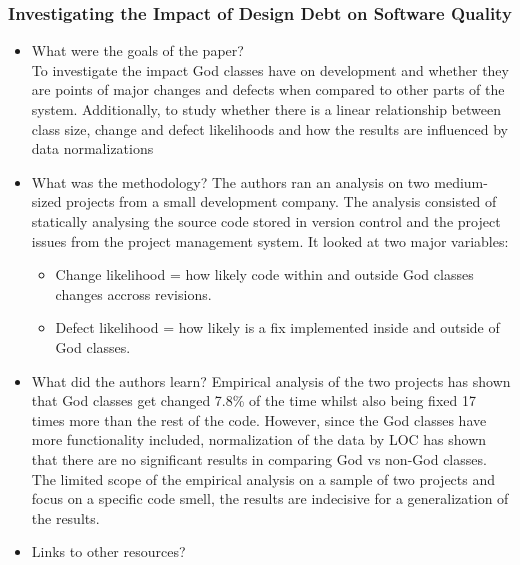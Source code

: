 \documentclass{mprop}
\begin{document}
\subsubsection{Investigating the Impact of Design Debt on Software Quality} \cite{Zazworka2011}
\begin{itemize}
	\item What were the goals of the paper? \\
	      To investigate the impact God classes have on development and whether they are points of major changes and defects when compared to other parts of the system. Additionally, to study whether there is a linear relationship between class size, change and defect likelihoods and how the results are influenced by data normalizations

	\item What was the methodology?
	      The authors ran an analysis on two medium-sized projects from a small development company. The analysis consisted of statically analysing the source code stored in version control and the project issues from the project management system.
	      It looked at two major variables:
	      \begin{itemize}
		      \item Change likelihood = how likely code within and outside God classes changes accross revisions.
		      \item Defect likelihood = how likely is a fix implemented inside and outside of God classes.
	      \end{itemize}
	\item What did the authors learn?
	      Empirical analysis of the two projects has shown that God classes get changed 7.8\% of the time whilst also being fixed 17 times more than the rest of the code.
	      However, since the God classes have more functionality included, normalization of the data by LOC has shown that there are no significant results in comparing God vs non-God classes.
	      The limited scope of the empirical analysis on a sample of two projects and focus on a specific code smell, the results are indecisive for a generalization of the results.
	\item Links to other resources?
\end{itemize}
\end{document}
